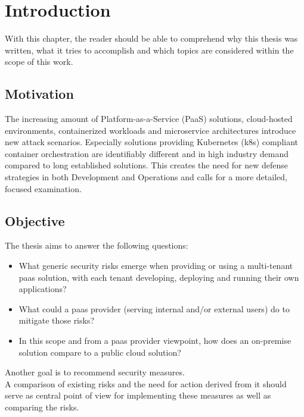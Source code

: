 \chapter{Introduction}
With this chapter, the reader should be able to comprehend why this thesis was written, 
what it tries to accomplish and which topics are considered within the scope of this work.

\section{Motivation}

The increasing amount of Platform-as-a-Service (PaaS) solutions, cloud-hosted environments, containerized workloads and microservice architectures introduce new attack scenarios. 
Especially solutions providing Kubernetes (k8s) compliant container orchestration are identifiably different and in high industry demand compared to long established solutions. 
This creates the need for new defense strategies in both Development and Operations and calls for a more detailed, focused examination. 

\section{Objective} \label{goal}

The thesis aims to answer the following questions:

\begin{itemize}

\item What generic security risks emerge when providing or using a multi-tenant \gls{paas} solution,
with each tenant developing, deploying and running their own applications? 

\item What could a \gls{paas} provider (serving internal and/or external users) do to mitigate those risks? 

\item  In this scope and from a \gls{paas} provider viewpoint, how does an on-premise solution compare
to a public cloud solution? 

\end{itemize}

Another goal is to recommend security measures. \\
A comparison of existing risks and the need for action derived from it should serve as central point of view for implementing these measures as well as comparing the risks. 


